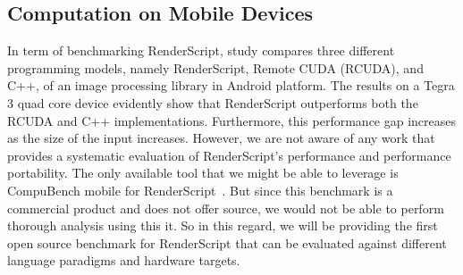 \subsection{Computation on Mobile Devices}

In term of benchmarking RenderScript, study \cite{kemp2013using} compares three
different programming models, namely RenderScript, Remote CUDA (RCUDA), and C++,
of an image processing library in Android platform. The results on a Tegra 3
quad core device evidently show that RenderScript outperforms both the RCUDA and
C++ implementations. Furthermore, this performance gap increases as the size of
the input increases.  However, we are not aware of any work that provides a
systematic evaluation of RenderScript's performance and performance portability.
The only available tool that we might be able to leverage is CompuBench mobile
for RenderScript~\cite{compuBenchMobile}.  But since this benchmark is a
commercial product and does not offer source, we would not be able to perform
thorough analysis using this it.  So in this regard, we will be providing the
first open source benchmark for RenderScript that can be evaluated against
different language paradigms and hardware targets.

